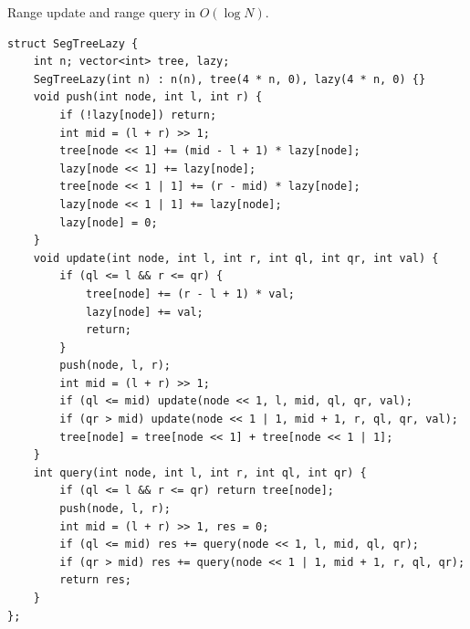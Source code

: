 
Range update and range query in $O(\log N)$.
\begin{lstlisting}
struct SegTreeLazy {
    int n; vector<int> tree, lazy;
    SegTreeLazy(int n) : n(n), tree(4 * n, 0), lazy(4 * n, 0) {}
    void push(int node, int l, int r) {
        if (!lazy[node]) return;
        int mid = (l + r) >> 1;
        tree[node << 1] += (mid - l + 1) * lazy[node];
        lazy[node << 1] += lazy[node];
        tree[node << 1 | 1] += (r - mid) * lazy[node];
        lazy[node << 1 | 1] += lazy[node];
        lazy[node] = 0;
    }
    void update(int node, int l, int r, int ql, int qr, int val) {
        if (ql <= l && r <= qr) {
            tree[node] += (r - l + 1) * val;
            lazy[node] += val;
            return;
        }
        push(node, l, r);
        int mid = (l + r) >> 1;
        if (ql <= mid) update(node << 1, l, mid, ql, qr, val);
        if (qr > mid) update(node << 1 | 1, mid + 1, r, ql, qr, val);
        tree[node] = tree[node << 1] + tree[node << 1 | 1];
    }
    int query(int node, int l, int r, int ql, int qr) {
        if (ql <= l && r <= qr) return tree[node];
        push(node, l, r);
        int mid = (l + r) >> 1, res = 0;
        if (ql <= mid) res += query(node << 1, l, mid, ql, qr);
        if (qr > mid) res += query(node << 1 | 1, mid + 1, r, ql, qr);
        return res;
    }
};
\end{lstlisting}
